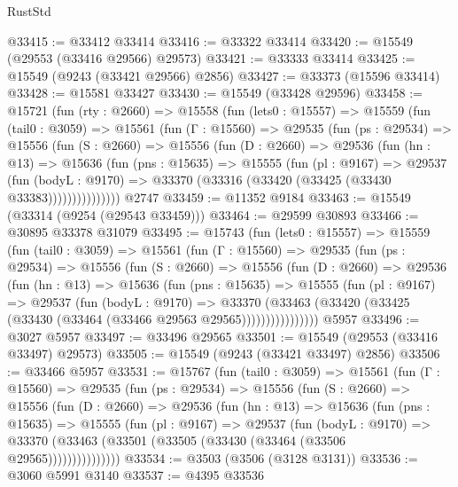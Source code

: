 \begin{lexlean}{RustStd}
\begin{coremodule}
@33415 := @33412 @33414
@33416 := @33322 @33414
@33420 := @15549 (@29553 (@33416 @29566) @29573)
@33421 := @33333 @33414
@33425 := @15549 (@9243 (@33421 @29566) @2856)
@33427 := @33373 (@15596 @33414)
@33428 := @15581 @33427
@33430 := @15549 (@33428 @29596)
@33458 := @15721
    (fun (rty : @2660) =>
    @15558
      (fun (lets0 : @15557) =>
      @15559
        (fun (tail0 : @3059) =>
        @15561
          (fun (Γ : @15560) =>
          @29535
            (fun (ps : @29534) =>
            @15556
              (fun (S : @2660) =>
              @15556
                (fun (D : @2660) =>
                @29536
                  (fun (hn : @13) =>
                  @15636
                    (fun (pns : @15635) =>
                    @15555
                      (fun (pl : @9167) =>
                      @29537
                        (fun (bodyL : @9170) =>
                        @33370 (@33316 (@33420 (@33425 (@33430 @33383)))))))))))))))
    @2747
@33459 := @11352 @9184
@33463 := @15549 (@33314 (@9254 (@29543 @33459)))
@33464 := @29599 @30893
@33466 := @30895 @33378 @31079
@33495 := @15743
    (fun (lets0 : @15557) =>
    @15559
      (fun (tail0 : @3059) =>
      @15561
        (fun (Γ : @15560) =>
        @29535
          (fun (ps : @29534) =>
          @15556
            (fun (S : @2660) =>
            @15556
              (fun (D : @2660) =>
              @29536
                (fun (hn : @13) =>
                @15636
                  (fun (pns : @15635) =>
                  @15555
                    (fun (pl : @9167) =>
                    @29537
                      (fun (bodyL : @9170) =>
                      @33370
                        (@33463
                          (@33420 (@33425 (@33430 (@33464 (@33466 @29563 @29565))))))))))))))))
    @5957
@33496 := @3027 @5957
@33497 := @33496 @29565
@33501 := @15549 (@29553 (@33416 @33497) @29573)
@33505 := @15549 (@9243 (@33421 @33497) @2856)
@33506 := @33466 @5957
@33531 := @15767
    (fun (tail0 : @3059) =>
    @15561
      (fun (Γ : @15560) =>
      @29535
        (fun (ps : @29534) =>
        @15556
          (fun (S : @2660) =>
          @15556
            (fun (D : @2660) =>
            @29536
              (fun (hn : @13) =>
              @15636
                (fun (pns : @15635) =>
                @15555
                  (fun (pl : @9167) =>
                  @29537
                    (fun (bodyL : @9170) =>
                    @33370 (@33463 (@33501 (@33505 (@33430 (@33464 (@33506 @29565)))))))))))))))
@33534 := @3503 (@3506 (@3128 @3131))
@33536 := @3060 @5991 @3140
@33537 := @4395 @33536

\end{coremodule}
\end{lexlean}
